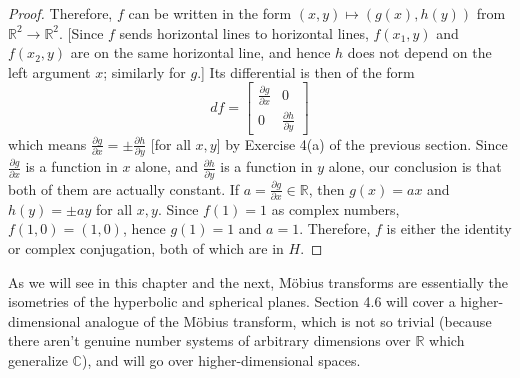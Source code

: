 \documentclass[leqno]{book}
\begin{document}
\begin{proof}
Therefore, $f$ can be written in the form $(x,y)\mapsto(g(x),h(y))$ from $\mathbb R^2\to\mathbb R^2$.  [Since $f$ sends horizontal lines to horizontal lines, $f(x_1,y)$ and $f(x_2,y)$ are on the same horizontal line, and hence $h$ does not depend on the left argument $x$; similarly for $g$.]  Its differential is then of the form
$$df=\begin{bmatrix}\frac{\partial g}{\partial x}&0\\0&\frac{\partial h}{\partial y}\end{bmatrix}$$
which means $\frac{\partial g}{\partial x}=\pm\frac{\partial h}{\partial y}$ [for all $x,y$] by Exercise 4(a) of the previous section.  Since $\frac{\partial g}{\partial x}$ is a function in $x$ alone, and $\frac{\partial h}{\partial y}$ is a function in $y$ alone, our conclusion is that both of them are actually constant.  If $a=\frac{\partial g}{\partial x}\in\mathbb R$, then $g(x)=ax$ and $h(y)=\pm ay$ for all $x,y$.  Since $f(1)=1$ as complex numbers, $f(1,0)=(1,0)$, hence $g(1)=1$ and $a=1$.  Therefore, $f$ is either the identity or complex conjugation, both of which are in $H$.
\end{proof}

\noindent As we will see in this chapter and the next, M\"obius transforms are essentially the isometries of the hyperbolic and spherical planes.  Section 4.6 will cover a higher-dimensional analogue of the M\"obius transform, which is not so trivial (because there aren't genuine number systems of arbitrary dimensions over $\mathbb R$ which generalize $\mathbb C$), and will go over higher-dimensional spaces. %
\end{document}
